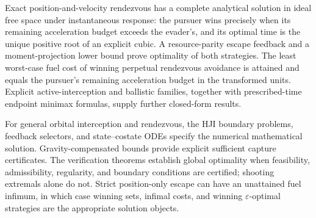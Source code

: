 \documentclass[journal,a4paper]{IEEEtran}
\begin{document}
Exact position-and-velocity rendezvous has a complete analytical solution in ideal free space under instantaneous response: the pursuer wins precisely when its remaining acceleration budget exceeds the evader's, and its optimal time is the unique positive root of an explicit cubic. A resource-parity escape feedback and a moment-projection lower bound prove optimality of both strategies. The least worst-case fuel cost of winning perpetual rendezvous avoidance is attained and equals the pursuer's remaining acceleration budget in the transformed units. Explicit active-interception and ballistic families, together with prescribed-time endpoint minimax formulas, supply further closed-form results.

For general orbital interception and rendezvous, the HJI boundary problems, feedback selectors, and state--costate ODEs specify the numerical mathematical solution. Gravity-compensated bounds provide explicit sufficient capture certificates. The verification theorems establish global optimality when feasibility, admissibility, regularity, and boundary conditions are certified; shooting extremals alone do not. Strict position-only escape can have an unattained fuel infimum, in which case winning sets, infimal costs, and winning $\varepsilon$-optimal strategies are the appropriate solution objects.



\end{document}

